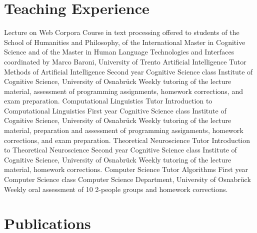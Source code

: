 \documentclass[11pt,a4paper]{moderncv}
\begin{document}
\section{Teaching Experience}
        {Lecture on Web Corpora}
        {Course in text processing}
        {offered to students of the School of Humanities and Philosophy, of the
        International Master in Cognitive Science and of the Master in Human
        Language Technologies and Interfaces}
        {coordinated by Marco Baroni, University of Trento}
        {}
        {Artificial Intelligence Tutor}
        {Methods of Artificial Intelligence}
        {Second year Cognitive Science class}
        {Institute of Cognitive Science, University of Osnabr\"{u}ck}
        {Weekly tutoring of the lecture material, assessment of programming
        assignments, homework corrections, and exam preparation.}	
        {Computational Linguistics Tutor}
        {Introduction to Computational Linguistics}
        {First year Cognitive Science class}
        {Institute of Cognitive Science, University of Osnabr\"{u}ck}
        {Weekly tutoring of the lecture material, preparation and assessment of
        programming assignments, homework corrections, and exam preparation.}
        {Theoretical Neuroscience Tutor}
        {Introduction to Theoretical Neuroscience}
        {Second year Cognitive Science class}
        {Institute of Cognitive Science, University of Osnabr\"{u}ck}
        {Weekly tutoring of the lecture material, homework corrections.}
        {Computer Science Tutor}
        {Algorithms}
        {First year Computer Science class}
        {Computer Science Department, University of Osnabr\"{u}ck}
        {Weekly oral assessment of 10 2-people groups and homework corrections.}
\closesection{}



%
%


\section{Publications}
\end{document}
